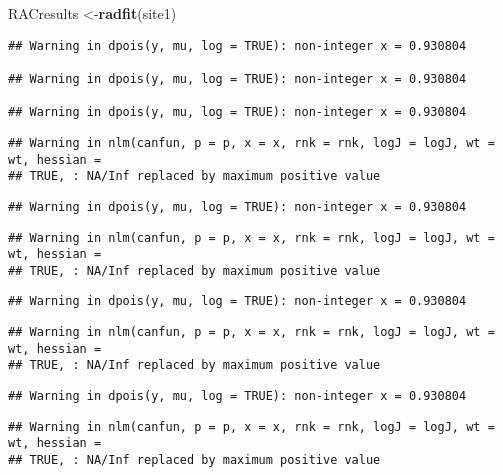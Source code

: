 \documentclass[
]{article}
\newenvironment{Shaded}{\begin{snugshade}}{\end{snugshade}}
\newcommand{\KeywordTok}[1]{\textcolor[rgb]{0.13,0.29,0.53}{\textbf{#1}}}
\newcommand{\NormalTok}[1]{#1}
\begin{document}
\begin{Shaded}
\begin{Highlighting}[]
\NormalTok{RACresults <-}\KeywordTok{radfit}\NormalTok{(site1)}
\end{Highlighting}
\end{Shaded}

\begin{verbatim}
## Warning in dpois(y, mu, log = TRUE): non-integer x = 0.930804

## Warning in dpois(y, mu, log = TRUE): non-integer x = 0.930804

## Warning in dpois(y, mu, log = TRUE): non-integer x = 0.930804
\end{verbatim}

\begin{verbatim}
## Warning in nlm(canfun, p = p, x = x, rnk = rnk, logJ = logJ, wt = wt, hessian =
## TRUE, : NA/Inf replaced by maximum positive value
\end{verbatim}

\begin{verbatim}
## Warning in dpois(y, mu, log = TRUE): non-integer x = 0.930804
\end{verbatim}

\begin{verbatim}
## Warning in nlm(canfun, p = p, x = x, rnk = rnk, logJ = logJ, wt = wt, hessian =
## TRUE, : NA/Inf replaced by maximum positive value
\end{verbatim}

\begin{verbatim}
## Warning in dpois(y, mu, log = TRUE): non-integer x = 0.930804
\end{verbatim}

\begin{verbatim}
## Warning in nlm(canfun, p = p, x = x, rnk = rnk, logJ = logJ, wt = wt, hessian =
## TRUE, : NA/Inf replaced by maximum positive value
\end{verbatim}

\begin{verbatim}
## Warning in dpois(y, mu, log = TRUE): non-integer x = 0.930804
\end{verbatim}

\begin{verbatim}
## Warning in nlm(canfun, p = p, x = x, rnk = rnk, logJ = logJ, wt = wt, hessian =
## TRUE, : NA/Inf replaced by maximum positive value
\end{verbatim}
\end{document}
